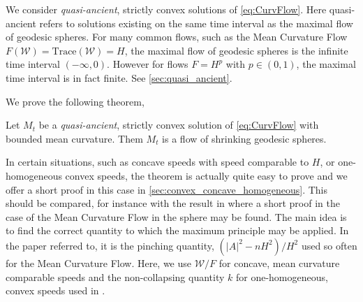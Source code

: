 \documentclass{amsart}
\begin{document}
We consider \emph{quasi-ancient}, strictly convex solutions of \eqref{eq:CurvFlow}. Here quasi-ancient refers to solutions existing on the same time interval as the maximal flow of geodesic spheres. For many common flows, such as the Mean Curvature Flow \(F(\mathcal{W}) = \text{Trace}(\mathcal{W}) = H\), the maximal flow of geodesic spheres is the infinite time interval \((-\infty, 0)\). However for flows \(F = H^p\) with \(p \in (0,1)\), the maximal time interval is in fact finite. See \cref{sec:quasi_ancient}.

We prove the following theorem,
\begin{theorem}
Let \(M_t\) be a \emph{quasi-ancient}, strictly convex solution of \eqref{eq:CurvFlow} with bounded mean curvature. Them \(M_t\) is a flow of shrinking geodesic spheres.
\end{theorem}

In certain situations, such as concave speeds with speed comparable to \(H\), or one-homogeneous convex speeds, the theorem is actually quite easy to prove and we offer a short proof in this case in \cref{sec:convex_concave_homogeneous}. This should be compared, for instance with the result in \cite[Theorem]{HuiskenSinestrari:05/2014} where a short proof in the case of the Mean Curvature Flow in the sphere may be found. The main idea is to find the correct quantity to which the maximum principle may be applied. In the paper referred to, it is the pinching quantity, \((|A|^2 - n H^2)/H^2\) used so often for the Mean Curvature Flow. Here, we use \(\mathcal{W}/F\) for concave, mean curvature comparable speeds and the non-collapsing quantity \(k\) for one-homogeneous, convex speeds used in \cite{andrews2015Non-collapsing}.
\end{document}
